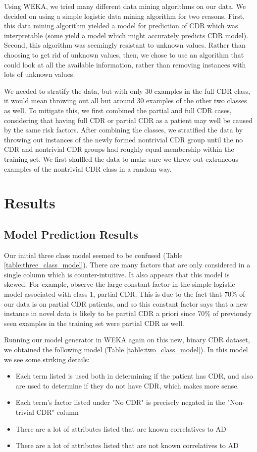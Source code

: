 \documentclass[10pt]{article}
\begin{document}
Using WEKA, we tried many different data mining algorithms on our data. We decided on using a simple logistic data mining algorithm for two reasons. First, this data mining algorithm yielded a model for prediction of CDR which was interpretable (some yield a model which might accurately predicts CDR model). Second, this algorithm was seemingly resistant to unknown values. Rather than choosing to get rid of unknown values, then, we chose to use an algorithm that could look at all the available information, rather than removing instances with lots of unknown values.

We needed to stratify the data, but with only 30 examples in the full CDR class, it would mean throwing out all but around 30 examples of the other two classes as well. To mitigate this, we first combined the partial and full CDR cases, considering that having full CDR or partial CDR as a patient may well be caused by the same risk factors. After combining the classes, we stratified the data by throwing out instances of the newly formed nontrivial CDR group until the no CDR and nontrivial CDR groups had roughly equal membership within the training set. We first shuffled the data to make sure we threw out extraneous examples of the nontrivial CDR class in a random way.

\section*{Results}
\subsection*{Model Prediction Results}

Our initial three class model seemed to be confused (Table \ref{table:three_class_model}). There are many factors that are only considered in a single column which is counter-intuitive.  It also appears that this model is skewed. For example, observe the large constant factor in the simple logistic model associated with class 1, partial CDR. This is due to the fact that 70\% of our data is on partial CDR patients, and so this constant factor says that a new instance in novel data is likely to be partial CDR a priori since 70\% of previously seen examples in the training set were partial CDR as well.


Running our model generator in WEKA again on this new, binary CDR dataset, we obtained the following model (Table \ref{table:two_class_model}). In this model we see some striking details:
\begin{itemize}
    \item Each term listed is used both in determining if the patient has CDR, and also are used to determine if they do not have CDR, which makes more sense.
    \item Each term's factor listed under "No CDR" is precisely negated in the "Non-trivial CDR" column
    \item There are a lot of attributes listed that are known correlatives to AD
    \item There are a lot of attributes listed that are not known correlatives to AD
\end{itemize}
\end{document}

